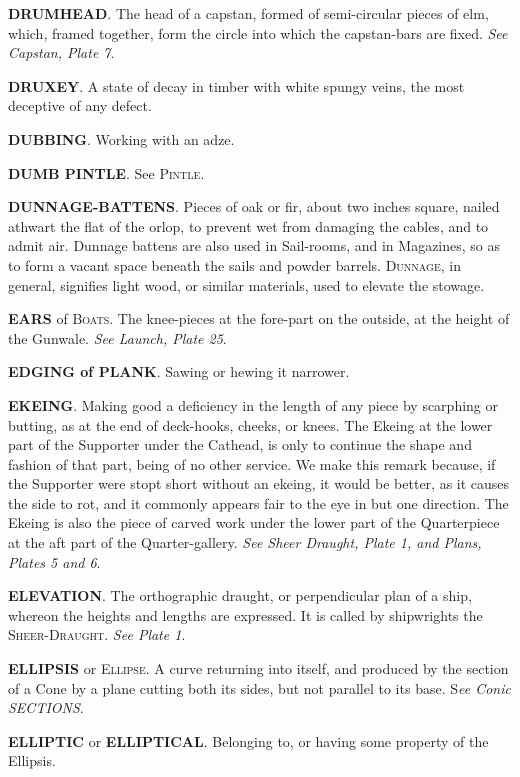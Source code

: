 \textbf{DRUMHEAD}. The head of a capstan, formed of semi-circular pieces of elm, which, framed together, form the circle into which the capstan-bars are fixed. \textit{See Capstan, Plate 7}. 

\textbf{DRUXEY}. A state of decay in timber with white spungy veins, the most deceptive of any defect. 

\textbf{DUBBING}. Working with an adze.

\textbf{DUMB PINTLE}. See \textsc{Pintle}. 

\textbf{DUNNAGE-BATTENS}. Pieces of oak or fir, about two inches square, nailed athwart the flat of the orlop, to prevent wet from damaging the cables, and to admit air. Dunnage battens are also used in Sail-rooms, and in Magazines, so as to form a vacant space beneath the sails and powder barrels. \textsc{Dunnage}, in general, signifies light wood, or similar materials, used to elevate the stowage. 

\textbf{EARS} of \textsc{Boats}. The knee-pieces at the fore-part on the outside, at the height of the Gunwale. \textit{See Launch, Plate 25}. 

\textbf{EDGING of PLANK}. Sawing or hewing it narrower. 

\textbf{EKEING}. Making good a deficiency in the length of any piece by scarphing or butting, as at the end of deck-hooks, cheeks, or knees. The Ekeing at the lower part of the Supporter under the Cathead, is only to continue the shape and fashion of that part, being of no other service. We make this remark because, if the Supporter were stopt short without an ekeing, it would be better, as it causes the side to rot, and it commonly appears fair to the eye in but one direction. The Ekeing is also the piece of carved work under the lower part of the Quarterpiece at the aft part of the Quarter-gallery. \textit{See Sheer Draught, Plate 1, and Plans, Plates 5 and 6}. 

\textbf{ELEVATION}. The orthographic draught, or perpendicular plan of a ship, whereon the heights and lengths are expressed. It is called by shipwrights the \textsc{Sheer-Draught}. \textit{See Plate 1}. 

\textbf{ELLIPSIS} or \textsc{Ellipse}. A curve returning into itself, and produced by the section of a Cone by a plane cutting both its sides, but not parallel to its base. S\textit{ee Conic SECTIONS}. 

\textbf{ELLIPTIC} or \textbf{ELLIPTICAL}. Belonging to, or having some property of the Ellipsis. 

